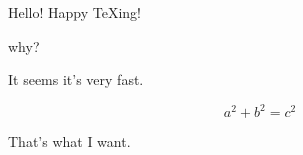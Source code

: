 \documentclass{article}
\begin{document}
Hello!
Happy \TeX ing!

why?

It seems it's very fast.

\begin{equation}
    a^2+b^2=c^2
\end{equation}

That's what I want.
\end{document}
